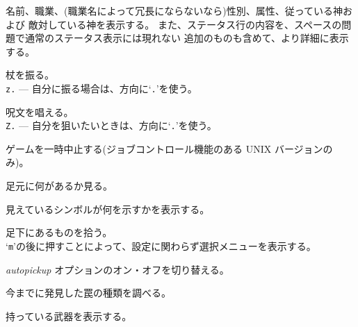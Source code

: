名前、職業、(職業名によって冗長にならないなら)性別、属性、従っている神および
敵対している神を表示する。
また、ステータス行の内容を、スペースの問題で通常のステータス表示には現れない
追加のものも含めて、より詳細に表示する。
\item[\tb{z}]
杖を振る。\\
{\tt z.} --- 自分に振る場合は、方向に`{\tt .}'を使う。
\item[\tb{Z}]
呪文を唱える。\\
{\tt Z.} --- 自分を狙いたいときは、方向に`{\tt .}'を使う。
\item[\tb{\^{}Z}]
ゲームを一時中止する(ジョブコントロール機能のある UNIX バージョンのみ)。
\item[\tb{:}]
足元に何があるか見る。
\item[\tb{;}]
見えているシンボルが何を示すかを表示する。
\item[\tb{,}]
足下にあるものを拾う。\\
`{\tt m}'の後に押すことによって、設定に関わらず選択メニューを表示する。
\item[\tb{@}]
{\it autopickup\/} オプションのオン・オフを切り替える。
\item[\tb{\^{}}]
今までに発見した罠の種類を調べる。
\item[\tb{)}]
持っている武器を表示する。
\item[\tb{[}]
